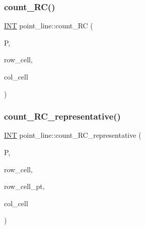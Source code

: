 \mbox{\label{classpoint__line_a5097ce8459b0cdbe78ea175cfb49a05c}} 
\subsubsection{\texorpdfstring{count\+\_\+\+R\+C()}{count\_RC()}}
{\footnotesize\ttfamily \mbox{\hyperlink{galois_8h_a09fddde158a3a20bd2dcadb609de11dc}{I\+NT}} point\+\_\+line\+::count\+\_\+\+RC (\begin{DoxyParamCaption}\item[{\mbox{\hyperlink{classpartitionstack}{partitionstack}} \&}]{P,  }\item[{\mbox{\hyperlink{galois_8h_a09fddde158a3a20bd2dcadb609de11dc}{I\+NT}}}]{row\+\_\+cell,  }\item[{\mbox{\hyperlink{galois_8h_a09fddde158a3a20bd2dcadb609de11dc}{I\+NT}}}]{col\+\_\+cell }\end{DoxyParamCaption})}

\mbox{\label{classpoint__line_aed7c3bbb2fcced09f3a7cb102d682693}} 
\subsubsection{\texorpdfstring{count\+\_\+\+R\+C\+\_\+representative()}{count\_RC\_representative()}}
{\footnotesize\ttfamily \mbox{\hyperlink{galois_8h_a09fddde158a3a20bd2dcadb609de11dc}{I\+NT}} point\+\_\+line\+::count\+\_\+\+R\+C\+\_\+representative (\begin{DoxyParamCaption}\item[{\mbox{\hyperlink{classpartitionstack}{partitionstack}} \&}]{P,  }\item[{\mbox{\hyperlink{galois_8h_a09fddde158a3a20bd2dcadb609de11dc}{I\+NT}}}]{row\+\_\+cell,  }\item[{\mbox{\hyperlink{galois_8h_a09fddde158a3a20bd2dcadb609de11dc}{I\+NT}}}]{row\+\_\+cell\+\_\+pt,  }\item[{\mbox{\hyperlink{galois_8h_a09fddde158a3a20bd2dcadb609de11dc}{I\+NT}}}]{col\+\_\+cell }\end{DoxyParamCaption})}

